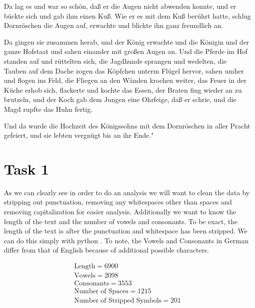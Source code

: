\documentclass[11pt,a4paper]{CLabBookTemplate} %
\begin{document}
Da lag es und war so schön, daß er die Augen nicht abwenden konnte, und er bückte sich und gab ihm einen Kuß. Wie er es mit dem Kuß berührt hatte, schlug Dornröschen die Augen auf, erwachte und blickte ihn ganz freundlich an.

Da gingen sie zusammen herab, und der König erwachte und die Königin und der ganze Hofstaat und sahen einander mit großen Augen an. Und die Pferde im Hof standen auf und rüttelten sich, die Jagdhunde sprangen und wedelten, die Tauben auf dem Dache zogen das Köpfchen unterm Flügel hervor, sahen umher und flogen ins Feld, die Fliegen an den Wänden krochen weiter, das Feuer in der Küche erhob sich, flackerte und kochte das Essen, der Braten fing wieder an zu brutzeln, und der Koch gab dem Jungen eine Ohrfeige, daß er schrie, und die Magd rupfte das Huhn fertig.

Und da wurde die Hochzeit des Königssohns mit dem Dornröschen in aller Pracht gefeiert, und sie lebten vergnügt bis an ihr Ende."



\newpage
\section{Task 1}
As we can clearly see in order to do an analysis we will want to clean the data by stripping out punctuation, removing any whitespaces other than spaces and removing capitalization for easier analysis. Additionally we want to know the length of the text and the number of vowels and consonants. To be exact, the length of the text is after the punctuation and whitespace has been stripped. We can do this simply with python . To note, the Vowels and Consonants in German differ from that of English because of additional possible characters. 


\begin{gather}
	\textrm{Length} = 6900 \\
	\textrm{Vowels} = 2098\\
	\textrm{Consonants} = 3553\\
	\textrm{Number of Spaces} = 1215 \\
	\textrm{Number of Stripped Symbols} = 201 
\end{gather}
\newpage
\end{document}
